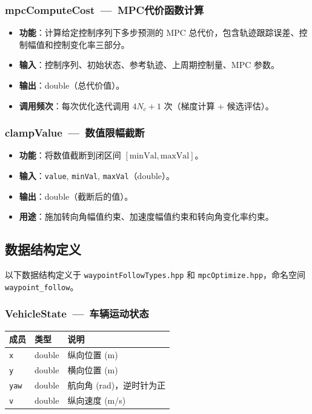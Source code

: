 \documentclass[a4paper,10pt]{article}
\begin{document}
\subsubsection{mpcComputeCost~---~MPC代价函数计算}

\begin{itemize}
  \item \textbf{功能}：计算给定控制序列下多步预测的 MPC 总代价，包含轨迹跟踪误差、控制幅值和控制变化率三部分。
  \item \textbf{输入}：控制序列、初始状态、参考轨迹、上周期控制量、MPC 参数。
  \item \textbf{输出}：double（总代价值）。
  \item \textbf{调用频次}：每次优化迭代调用 $4 N_c + 1$ 次（梯度计算 + 候选评估）。
\end{itemize}

\subsubsection{clampValue~---~数值限幅截断}

\begin{itemize}
  \item \textbf{功能}：将数值截断到闭区间 $[\text{minVal}, \text{maxVal}]$。
  \item \textbf{输入}：\texttt{value}, \texttt{minVal}, \texttt{maxVal}（double）。
  \item \textbf{输出}：double（截断后的值）。
  \item \textbf{用途}：施加转向角幅值约束、加速度幅值约束和转向角变化率约束。
\end{itemize}

\subsection{数据结构定义}

以下数据结构定义于 \texttt{waypointFollowTypes.hpp} 和 \texttt{mpcOptimize.hpp}，命名空间 \texttt{waypoint\_follow}。

\subsubsection{VehicleState~---~车辆运动状态}
\begin{longtable}{|L{3.5cm}|C{2cm}|L{9.5cm}|}
\hline
\textbf{成员} & \textbf{类型} & \textbf{说明} \\
\hline
\texttt{x} & double & 纵向位置 (m) \\
\hline
\texttt{y} & double & 横向位置 (m) \\
\hline
\texttt{yaw} & double & 航向角 (rad)，逆时针为正 \\
\hline
\texttt{v} & double & 纵向速度 (m/s) \\
\hline
\end{longtable}
\end{document}
